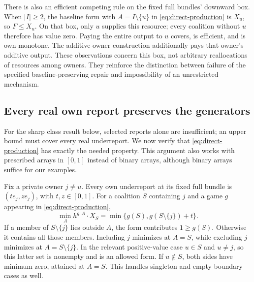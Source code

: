 There is also an efficient competing rule on the fixed full bundles'
downward box.  When $|I|\ge2$, the baseline form with $A=I\setminus\{u\}$
in \eqref{eq:direct-production} is $X_u$, so $F\le X_u$.  On that box,
only $u$ supplies this resource; every coalition without $u$ therefore
has value zero.  Paying the entire output to $u$ covers, is efficient,
and is own-monotone.  The additive-owner construction additionally pays
that owner's additive output.  These observations concern this box,
not arbitrary reallocations of resources among owners.  They reinforce
the distinction between failure of the specified baseline-preserving
repair and impossibility of an unrestricted mechanism.

\subsection{Every real own report preserves the generators}
\label{app:real-reports}

For the sharp class result below, selected reports alone are insufficient;
an upper bound must cover every real underreport.  We now verify that
\eqref{eq:direct-production} has exactly the needed property.  This
argument also works with prescribed arrays in $[0,1]$ instead of binary
arrays, although binary arrays suffice for our examples.

Fix a private owner $j\ne u$.  Every own underreport at its fixed full
bundle is $(t e_j,z e_j)$, with $t,z\in[0,1]$.  For a coalition $S$
containing $j$ and a game $g$ appearing in \eqref{eq:direct-production},
\begin{equation}
 \min_A h^{g,A}\cdot X_S
       =\min\{g(S),g(S\setminus\{j\})+t\}.
 \label{eq:real-base-form}
\end{equation}
If a member of $S\setminus\{j\}$ lies outside $A$, the form contributes
$1\ge g(S)$.  Otherwise it contains all those members.  Including $j$
minimizes at $A=S$, while excluding $j$ minimizes at
$A=S\setminus\{j\}$.  In the relevant positive-value case $u\in S$
and $u\ne j$, so this latter set is nonempty and is an allowed form.
If $u\notin S$, both sides have minimum zero, attained at $A=S$.
This handles singleton and empty boundary cases as well.

